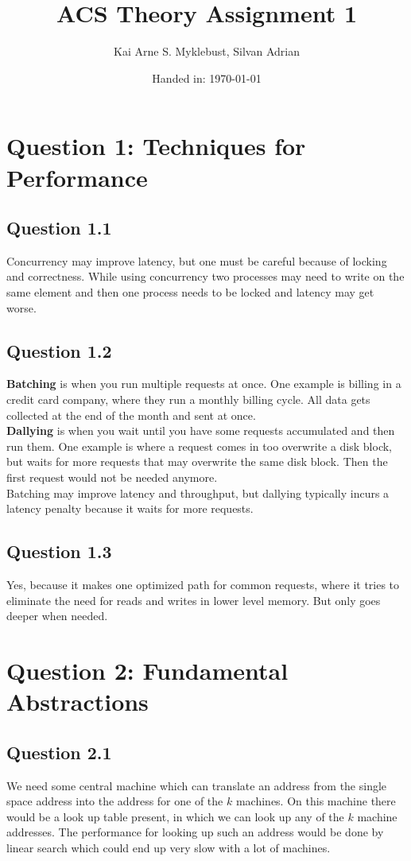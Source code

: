 \documentclass[12pt,a4paper]{article}
\begin{document}
\title{ACS Theory Assignment 1}
\subtitle{}

\author{Kai Arne S. Myklebust, Silvan Adrian}
\date{Handed in: \today}
	
\maketitle
\tableofcontents

\section{Question 1: Techniques for Performance}
\subsection{Question 1.1}
Concurrency may improve latency, but one must be careful because of locking and correctness. While using concurrency two processes may need to write on the same element and then one process needs to be locked and latency may get worse.
\subsection{Question 1.2}
\textbf{Batching} is when you run multiple requests at once. One example is billing in a credit card company, where they run a monthly billing cycle. All data gets collected at the end of the month and sent at once. \\
\textbf{Dallying} is when you wait until you have some requests accumulated and then run them. One example is where a request comes in too overwrite a disk block, but waits for more requests that may overwrite the same disk block. Then the first request would not be needed anymore. \\
Batching may improve latency and throughput, but dallying typically incurs a latency penalty because it waits for more requests.
\subsection{Question 1.3}
Yes, because it makes one optimized path for common requests, where it tries to eliminate the need for reads and writes in lower level memory. But only goes deeper when needed.

\section{Question 2: Fundamental Abstractions}
\subsection{Question 2.1}
We need some central machine which can translate an address from the single space address into the address for one of the $k$ machines.
On this machine there would be a look up table present, in which we can look up any of the $k$ machine addresses.
The performance for looking up such an address would be done by linear search which could end up very slow with a lot of machines.
\end{document}
